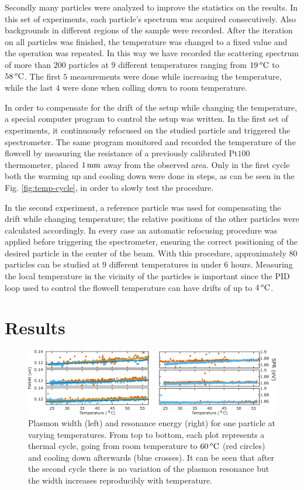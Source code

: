 Secondly many particles were analyzed to improve the statistics on the results.
In this set of experiments, each particle's spectrum was acquired consecutively.
Also backgrounds in different regions of the sample were recorded. After the
iteration on all particles was finished, the temperature was changed to a fixed
value and the operation was repeated. In this way we have recorded the
scattering spectrum of more than $200$ particles at $9$ different temperatures
ranging from $19\,^o\textrm{C}$ to $58\,^o\textrm{C}$. The first $5$ measurements were done
while increasing the temperature, while the last $4$ were done when colling down
to room temperature.

In order to compensate for the drift of the setup while changing the
temperature, a special computer program to control the setup was written. In the
first set of experiments, it continuously refocused on the studied particle and
triggered the spectrometer. The same program monitored and recorded the
temperature of the flowcell by measuring the resistance of a previously
calibrated Pt$100$ thermometer, placed $1\,\textrm{mm}$ away from the observed area. Only
in the first cycle both the warming up and cooling down were done in steps, as
can be seen in the Fig. \ref{fig:temp-cycle}, in order to slowly test the
procedure.

In the second experiment, a reference particle was used for compensating the
drift while changing temperature; the relative positions of the other particles
were calculated accordingly. In every case an automatic refocusing procedure was
applied before triggering the spectrometer, ensuring the correct positioning of
the desired particle in the center of the beam. With this procedure,
approximately $80$ particles can be studied at $9$ different temperatures in
under $6$ hours. Measuring the local temperature in the vicinity of the
particles is important since the PID loop used to control the flowcell
temperature can have drifts of up to $4\,^o\textrm{C}$.

\section{Results}
\begin{figure}[htp] \centering
\includegraphics[width=17cm]{Chapters/05_WhiteLight/Figures/02_One_Pcle/02_One_Pcle.png}
\caption{Plasmon width (left) and resonance energy (right) for one particle at
varying temperatures. From top to bottom, each plot represents a thermal cycle,
going from room temperature to $60\,^o\textrm{C}$ (red circles) and cooling down
afterwards (blue crosses). It can be seen that after the second cycle there is
no variation of the plasmon resonance but the width increases reproducibly with
temperature.}
	\label{fig:one_pcle}
\end{figure}

